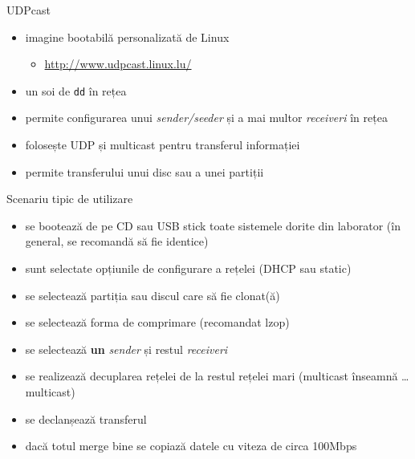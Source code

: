 \documentclass{simple}
\begin{document}
\begin{frame}{UDPcast}
  \begin{itemize}
    \item imagine bootabilă personalizată de Linux
      \begin{itemize}
        \item \url{http://www.udpcast.linux.lu/}
      \end{itemize}
    \item un soi de \texttt{dd} în rețea
    \item permite configurarea unui \textit{sender/seeder} și a mai multor
      \textit{receiveri} în rețea
    \item folosește UDP și multicast pentru transferul informației
    \item permite transferului unui disc sau a unei partiții
  \end{itemize}
\end{frame}

\begin{frame}{Scenariu tipic de utilizare}
  \begin{itemize}
    \item se bootează de pe CD sau USB stick toate sistemele dorite din
      laborator (în general, se recomandă să fie identice)
    \item sunt selectate opțiunile de configurare a rețelei (DHCP sau static)
    \item se selectează partiția sau discul care să fie clonat(ă)
    \item se selectează forma de comprimare (recomandat lzop)
    \item se selectează \textbf{un} \textit{sender} și restul
      \textit{receiveri}
    \item se realizează decuplarea rețelei de la restul rețelei mari
      (multicast înseamnă \ldots multicast)
    \item se declanșează transferul
    \item dacă totul merge bine se copiază datele cu viteza de circa 100Mbps
  \end{itemize}
\end{frame}
\end{document}
